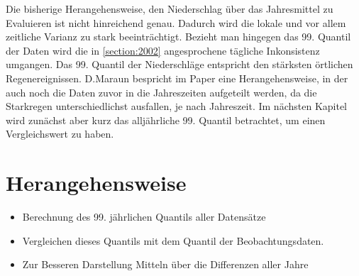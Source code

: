 Die bisherige Herangehensweise, den Niederschlag über das Jahresmittel zu Evaluieren ist nicht hinreichend genau. Dadurch wird die lokale und vor allem zeitliche Varianz zu stark beeinträchtigt. Bezieht man hingegen das 99. Quantil der Daten wird die in \ref{section:2002} angesprochene tägliche Inkonsistenz umgangen. Das 99. Quantil der Niederschläge entspricht den stärksten örtlichen Regenereignissen. D.Maraun bespricht im Paper \cite{biasMaraun} eine Herangehensweise, in der auch noch die Daten zuvor in die Jahreszeiten aufgeteilt werden, da die Starkregen unterschiedlichst ausfallen, je nach Jahreszeit. Im nächsten Kapitel wird zunächst aber kurz das alljährliche 99. Quantil betrachtet, um einen Vergleichswert zu haben.
\section{Herangehensweise}
\begin{itemize}
	\item Berechnung des 99. jährlichen Quantils aller Datensätze
	\item Vergleichen dieses Quantils mit dem Quantil der Beobachtungsdaten.
	\item Zur Besseren Darstellung Mitteln über die Differenzen aller Jahre
\end{itemize}


